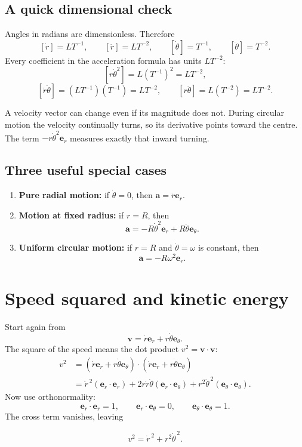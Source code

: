 \documentclass[11pt,a4paper]{article}
\newcommand{\er}{\bm e_r}
\newcommand{\etheta}{\bm e_\theta}
\newcommand{\vv}{\bm v}
\newcommand{\acc}{\bm a}
\begin{document}
\subsection{A quick dimensional check}

Angles in radians are dimensionless. Therefore
\[
  [\dot r]=LT^{-1},
  \qquad
  [\ddot r]=LT^{-2},
  \qquad
  [\dot\theta]=T^{-1},
  \qquad
  [\ddot\theta]=T^{-2}.
\]
Every coefficient in the acceleration formula has units $LT^{-2}$:
\[
  [r\dot\theta^2]=L(T^{-1})^2=LT^{-2},
\]
\[
  [\dot r\dot\theta]=(LT^{-1})(T^{-1})=LT^{-2},
  \qquad
  [r\ddot\theta]=L(T^{-2})=LT^{-2}.
\]

\begin{idea}
A velocity vector can change even if its magnitude does not. During circular motion the velocity continually turns, so its derivative points toward the centre. The term $-r\dot\theta^2\er$ measures exactly that inward turning.
\end{idea}

\subsection{Three useful special cases}

\begin{enumerate}
  \item \textbf{Pure radial motion:} if $\dot\theta=0$, then $\acc=\ddot r\er$.
  \item \textbf{Motion at fixed radius:} if $r=R$, then
  \[
    \acc=-R\dot\theta^2\er+R\ddot\theta\etheta.
  \]
  \item \textbf{Uniform circular motion:} if $r=R$ and $\dot\theta=\omega$ is constant, then
  \[
    \acc=-R\omega^2\er.
  \]
\end{enumerate}

\clearpage

\section{Speed squared and kinetic energy}

Start again from
\[
  \vv=\dot r\er+r\dot\theta\etheta.
\]
The square of the speed means the dot product $v^2=\vv\cdot\vv$:
\begin{align*}
  v^2
  &=(\dot r\er+r\dot\theta\etheta)
    \cdot(\dot r\er+r\dot\theta\etheta)\\
  &=\dot r^{\,2}(\er\cdot\er)
    +2r\dot r\dot\theta(\er\cdot\etheta)
    +r^2\dot\theta^{\,2}(\etheta\cdot\etheta).
\end{align*}
Now use orthonormality:
\[
  \er\cdot\er=1,
  \qquad
  \er\cdot\etheta=0,
  \qquad
  \etheta\cdot\etheta=1.
\]
The cross term vanishes, leaving
\begin{result}
\[
  \boxed{v^2=\dot r^{\,2}+r^2\dot\theta^{\,2}.}
\]
\end{result}
\end{document}
